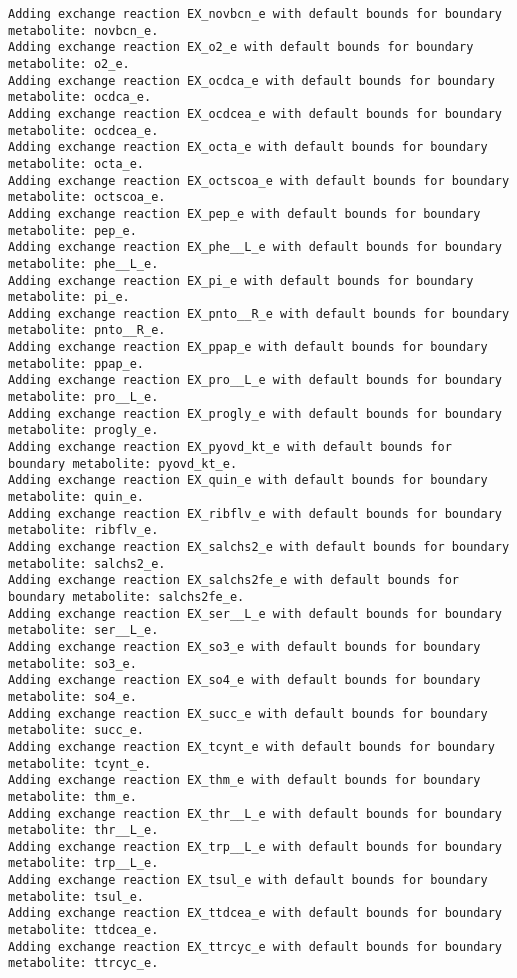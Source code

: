 \documentclass[
  letterpaper,
  DIV=11,
  numbers=noendperiod]{scrartcl}
\begin{document}
\begin{verbatim}
Adding exchange reaction EX_novbcn_e with default bounds for boundary metabolite: novbcn_e.
Adding exchange reaction EX_o2_e with default bounds for boundary metabolite: o2_e.
Adding exchange reaction EX_ocdca_e with default bounds for boundary metabolite: ocdca_e.
Adding exchange reaction EX_ocdcea_e with default bounds for boundary metabolite: ocdcea_e.
Adding exchange reaction EX_octa_e with default bounds for boundary metabolite: octa_e.
Adding exchange reaction EX_octscoa_e with default bounds for boundary metabolite: octscoa_e.
Adding exchange reaction EX_pep_e with default bounds for boundary metabolite: pep_e.
Adding exchange reaction EX_phe__L_e with default bounds for boundary metabolite: phe__L_e.
Adding exchange reaction EX_pi_e with default bounds for boundary metabolite: pi_e.
Adding exchange reaction EX_pnto__R_e with default bounds for boundary metabolite: pnto__R_e.
Adding exchange reaction EX_ppap_e with default bounds for boundary metabolite: ppap_e.
Adding exchange reaction EX_pro__L_e with default bounds for boundary metabolite: pro__L_e.
Adding exchange reaction EX_progly_e with default bounds for boundary metabolite: progly_e.
Adding exchange reaction EX_pyovd_kt_e with default bounds for boundary metabolite: pyovd_kt_e.
Adding exchange reaction EX_quin_e with default bounds for boundary metabolite: quin_e.
Adding exchange reaction EX_ribflv_e with default bounds for boundary metabolite: ribflv_e.
Adding exchange reaction EX_salchs2_e with default bounds for boundary metabolite: salchs2_e.
Adding exchange reaction EX_salchs2fe_e with default bounds for boundary metabolite: salchs2fe_e.
Adding exchange reaction EX_ser__L_e with default bounds for boundary metabolite: ser__L_e.
Adding exchange reaction EX_so3_e with default bounds for boundary metabolite: so3_e.
Adding exchange reaction EX_so4_e with default bounds for boundary metabolite: so4_e.
Adding exchange reaction EX_succ_e with default bounds for boundary metabolite: succ_e.
Adding exchange reaction EX_tcynt_e with default bounds for boundary metabolite: tcynt_e.
Adding exchange reaction EX_thm_e with default bounds for boundary metabolite: thm_e.
Adding exchange reaction EX_thr__L_e with default bounds for boundary metabolite: thr__L_e.
Adding exchange reaction EX_trp__L_e with default bounds for boundary metabolite: trp__L_e.
Adding exchange reaction EX_tsul_e with default bounds for boundary metabolite: tsul_e.
Adding exchange reaction EX_ttdcea_e with default bounds for boundary metabolite: ttdcea_e.
Adding exchange reaction EX_ttrcyc_e with default bounds for boundary metabolite: ttrcyc_e.

\end{verbatim}
\end{document}
